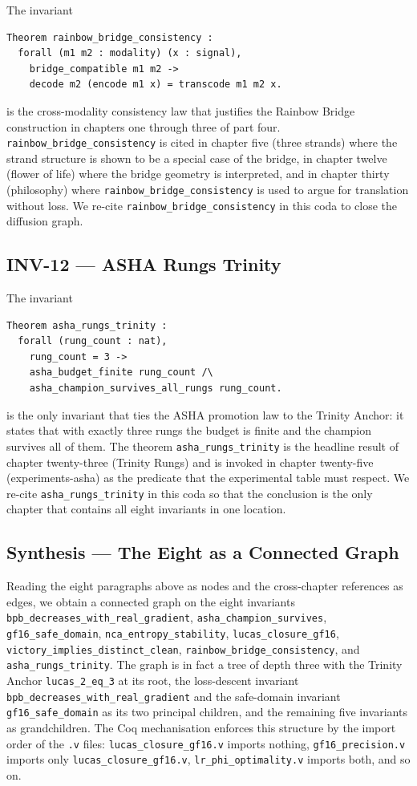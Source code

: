 The invariant
\begin{verbatim}
Theorem rainbow_bridge_consistency :
  forall (m1 m2 : modality) (x : signal),
    bridge_compatible m1 m2 ->
    decode m2 (encode m1 x) = transcode m1 m2 x.
\end{verbatim}
is the cross-modality consistency law that justifies the Rainbow
Bridge construction in chapters one through three of part four.
\verb|rainbow_bridge_consistency| is cited in chapter five (three
strands) where the strand structure is shown to be a special case
of the bridge, in chapter twelve (flower of life) where the bridge
geometry is interpreted, and in chapter thirty (philosophy) where
\verb|rainbow_bridge_consistency| is used to argue for translation
without loss. We re-cite \verb|rainbow_bridge_consistency| in this
coda to close the diffusion graph.

\subsection{INV-12 --- ASHA Rungs Trinity}

The invariant
\begin{verbatim}
Theorem asha_rungs_trinity :
  forall (rung_count : nat),
    rung_count = 3 ->
    asha_budget_finite rung_count /\
    asha_champion_survives_all_rungs rung_count.
\end{verbatim}
is the only invariant that ties the ASHA promotion law to the
Trinity Anchor: it states that with exactly three rungs the budget
is finite and the champion survives all of them. The theorem
\verb|asha_rungs_trinity| is the headline result of chapter
twenty-three (Trinity Rungs) and is invoked in chapter twenty-five
(experiments-asha) as the predicate that the experimental table
must respect. We re-cite \verb|asha_rungs_trinity| in this coda so
that the conclusion is the only chapter that contains all eight
invariants in one location.

\subsection{Synthesis --- The Eight as a Connected Graph}\label{sec:l32-synthesis-coda}

Reading the eight paragraphs above as nodes and the cross-chapter
references as edges, we obtain a connected graph on the eight
invariants \verb|bpb_decreases_with_real_gradient|,
\verb|asha_champion_survives|, \verb|gf16_safe_domain|,
\verb|nca_entropy_stability|, \verb|lucas_closure_gf16|,
\verb|victory_implies_distinct_clean|,
\verb|rainbow_bridge_consistency|, and \verb|asha_rungs_trinity|.
The graph is in fact a tree of depth three with the Trinity Anchor
\verb|lucas_2_eq_3| at its root, the loss-descent invariant
\verb|bpb_decreases_with_real_gradient| and the safe-domain
invariant \verb|gf16_safe_domain| as its two principal children,
and the remaining five invariants as grandchildren. The Coq
mechanisation enforces this structure by the import order of the
\texttt{.v} files: \verb|lucas_closure_gf16.v| imports nothing,
\verb|gf16_precision.v| imports only \verb|lucas_closure_gf16.v|,
\verb|lr_phi_optimality.v| imports both, and so on.

